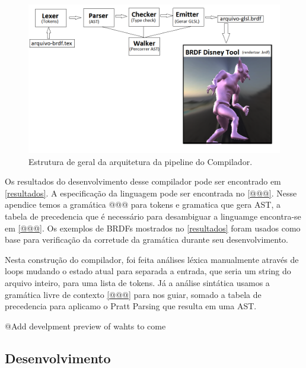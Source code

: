 \begin{figure}[H]
  \caption{\label{fig-estrutura-geral-compilador} \small Estrutura de geral da arquitetura da pipeline do Compilador.}
  \begin{center}
    \includegraphics[scale=0.62]{./Imagens/estutura-geral-do-projeto.png}
  \end{center}
\end{figure}

Os resultados do desenvolvimento desse compilador pode ser encontrado em \autoref{resultados}.
A especificação da linguagem pode ser encontrada no \autoref{@@@}. Nesse apendice temos a gramática @@@ para tokens e gramatica que gera AST, a tabela de precedencia que é necessário para desambiguar a linguamge encontra-se em \autoref{@@@}.
Os exemplos de BRDFs mostrados no \autoref{resultados} foram usados como base para verificação da corretude da gramática durante seu desenvolvimento.

Nesta construção do compilador, foi feita análises léxica manualmente através de loops mudando o estado atual para separada a entrada, que seria um string do arquivo inteiro, para uma lista de tokens. Já a análise sintática usamos a gramática livre de contexto \autoref{@@@} para nos guiar, somado a tabela de precedencia para aplicamo o Pratt Parsing que resulta em uma AST.

%
%

@{Add develpment preview of wahts to come}
\subsection{Desenvolvimento}

